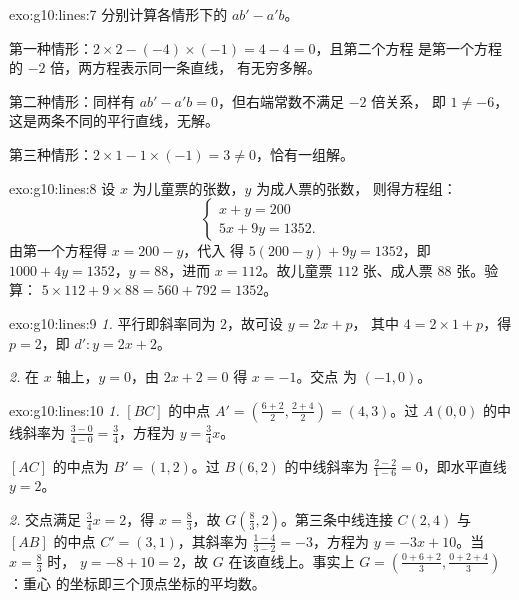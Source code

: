 \begin{solution}{exo:g10:lines:7}
分别计算各情形下的 $ab' - a'b$。

第一种情形：$2 \times 2 - (-4) \times (-1) = 4 - 4 = 0$，且第二个方程
是第一个方程的 $-2$ 倍，两方程表示同一条直线，
有无穷多解。

第二种情形：同样有 $ab' - a'b = 0$，但右端常数不满足 $-2$ 倍关系，
即 $1 \neq -6$，这是两条不同的平行直线，无解。

第三种情形：$2 \times 1 - 1 \times (-1) = 3 \neq 0$，恰有一组解。
\end{solution}

\begin{solution}{exo:g10:lines:8}
设 $x$ 为儿童票的张数，$y$ 为成人票的张数，
则得方程组：
\[
\begin{cases}
x + y = 200 \\
5x + 9y = 1352 .
\end{cases}
\]
由第一个方程得 $x = 200 - y$，代入
得 $5(200 - y) + 9y = 1352$，即 $1000 + 4y = 1352$，$y = 88$，进而
$x = 112$。故儿童票 $112$ 张、成人票 $88$ 张。验算：
$5 \times 112 + 9 \times 88 = 560 + 792 = 1352$。
\end{solution}

\begin{solution}{exo:g10:lines:9}
\emph{1.} 平行即斜率同为 $2$，故可设 $y = 2x + p$，
其中 $4 = 2 \times 1 + p$，得 $p = 2$，即 $d'\colon y = 2x + 2$。

\emph{2.} 在 $x$ 轴上，$y = 0$，由 $2x + 2 = 0$ 得 $x = -1$。交点
为 $(-1, 0)$。
\end{solution}

\begin{solution}{exo:g10:lines:10}
\emph{1.} $[BC]$ 的中点 $A' = \left(\frac{6+2}{2},
\frac{2+4}{2}\right) = (4, 3)$。过 $A(0,0)$ 的中线斜率为
$\frac{3 - 0}{4 - 0} = \frac34$，方程为 $y = \frac34 x$。

$[AC]$ 的中点为 $B' = (1, 2)$。过 $B(6, 2)$ 的中线斜率为
$\frac{2 - 2}{1 - 6} = 0$，即水平直线 $y = 2$。

\emph{2.} 交点满足 $\frac34 x = 2$，得 $x = \frac83$，故
$G\left(\frac83, 2\right)$。第三条中线连接 $C(2,4)$ 与
$[AB]$ 的中点 $C' = (3, 1)$，其斜率为
$\frac{1 - 4}{3 - 2} = -3$，方程为 $y = -3x + 10$。当 $x = \frac83$ 时，
$y = -8 + 10 = 2$，故 $G$ 在该直线上。事实上
$G = \left(\frac{0 + 6 + 2}{3}, \frac{0 + 2 + 4}{3}\right)$：重心
的坐标即三个顶点坐标的平均数。
\end{solution}

